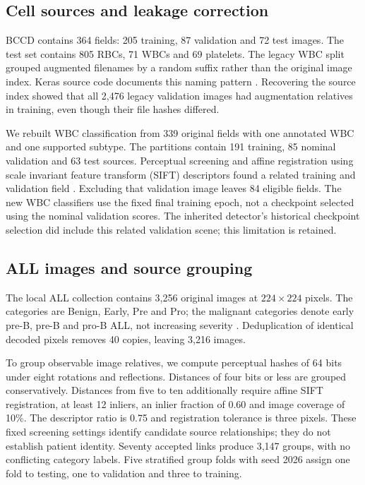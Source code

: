 \documentclass[conference,letterpaper]{IEEEtran}
\begin{document}
\subsection{Cell sources and leakage correction}
BCCD contains 364 fields: 205 training, 87 validation and 72 test images. The test set contains 805 RBCs, 71 WBCs and 69 platelets. The legacy WBC split grouped augmented filenames by a random suffix rather than the original image index. Keras source code documents this naming pattern \cite{keras}. Recovering the source index showed that all 2,476 legacy validation images had augmentation relatives in training, even though their file hashes differed.

We rebuilt WBC classification from 339 original fields with one annotated WBC and one supported subtype. The partitions contain 191 training, 85 nominal validation and 63 test sources. Perceptual screening and affine registration using scale invariant feature transform (SIFT) descriptors found a related training and validation field \cite{lowe}. Excluding that validation image leaves 84 eligible fields. The new WBC classifiers use the fixed final training epoch, not a checkpoint selected using the nominal validation scores. The inherited detector's historical checkpoint selection did include this related validation scene; this limitation is retained.

\subsection{ALL images and source grouping}
The local ALL collection contains 3,256 original images at $224\times224$ pixels. The categories are Benign, Early, Pre and Pro; the malignant categories denote early pre-B, pre-B and pro-B ALL, not increasing severity \cite{ghader,all_data}. Deduplication of identical decoded pixels removes 40 copies, leaving 3,216 images.

To group observable image relatives, we compute perceptual hashes of 64 bits under eight rotations and reflections. Distances of four bits or less are grouped conservatively. Distances from five to ten additionally require affine SIFT registration, at least 12 inliers, an inlier fraction of 0.60 and image coverage of 10\%. The descriptor ratio is 0.75 and registration tolerance is three pixels. These fixed screening settings identify candidate source relationships; they do not establish patient identity. Seventy accepted links produce 3,147 groups, with no conflicting category labels. Five stratified group folds with seed 2026 assign one fold to testing, one to validation and three to training.
\end{document}
